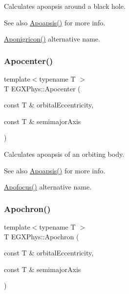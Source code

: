Calculates apoapsis around a black hole. 

\begin{DoxySeeAlso}{See also}
\mbox{\hyperlink{group___e_g_x_phys-_apoapsis_gaf962e650bf84a568458e8eb39b1c61ba}{Apoapsis()}} for more info. 

\mbox{\hyperlink{group___e_g_x_phys-_apoapsis_ga83e866e2f887ff8eafbc3971d4cab8be}{Aponigricon()}} alternative name. 
\end{DoxySeeAlso}
\mbox{\label{group___e_g_x_phys-_apoapsis_ga5e51a53e2f974264bada34f159fdc948}} 
\subsubsection{\texorpdfstring{Apocenter()}{Apocenter()}}
{\footnotesize\ttfamily template$<$typename T $>$ \\
T E\+G\+X\+Phys\+::\+Apocenter (\begin{DoxyParamCaption}\item[{const T \&}]{orbital\+Eccentricity,  }\item[{const T \&}]{semimajor\+Axis }\end{DoxyParamCaption})}



Calculates apoapsis of an orbiting body. 

\begin{DoxySeeAlso}{See also}
\mbox{\hyperlink{group___e_g_x_phys-_apoapsis_gaf962e650bf84a568458e8eb39b1c61ba}{Apoapsis()}} for more info. 

\mbox{\hyperlink{group___e_g_x_phys-_apoapsis_gaa53ac4e15bc6bc0fecf72eadb7a513e0}{Apofocus()}} alternative name. 
\end{DoxySeeAlso}
\mbox{\label{group___e_g_x_phys-_apoapsis_gae4ea146039e6f32022321f0998e715e8}} 
\subsubsection{\texorpdfstring{Apochron()}{Apochron()}}
{\footnotesize\ttfamily template$<$typename T $>$ \\
T E\+G\+X\+Phys\+::\+Apochron (\begin{DoxyParamCaption}\item[{const T \&}]{orbital\+Eccentricity,  }\item[{const T \&}]{semimajor\+Axis }\end{DoxyParamCaption})}



